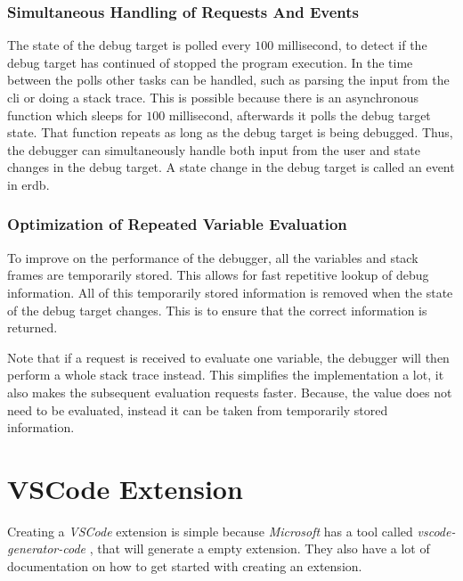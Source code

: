 \subsubsection{Simultaneous Handling of Requests And Events}
The state of the debug target is polled every $100$ millisecond, to detect if the debug target has continued of stopped the program execution.
In the time between the polls other tasks can be handled, such as parsing the input from the \acrshort{cli} or doing a stack trace.
This is possible because there is an asynchronous function which sleeps for $100$ millisecond, afterwards it polls the debug target state.
That function repeats as long as the debug target is being debugged.
Thus, the debugger can simultaneously handle both input from the user and state changes in the debug target.
A state change in the debug target is called an event in \gls{erdb}.



\subsubsection{Optimization of Repeated Variable Evaluation}
To improve on the performance of the debugger, all the variables and stack frames are temporarily stored.
This allows for fast repetitive lookup of debug information.
All of this temporarily stored information is removed when the state of the debug target changes.
This is to ensure that the correct information is returned.


Note that if a request is received to evaluate one variable, the debugger will then perform a whole stack trace instead.
This simplifies the implementation a lot, it also makes the subsequent evaluation requests faster.
Because, the value does not need to be evaluated, instead it can be taken from temporarily stored information.



\section{VSCode Extension}
Creating a \emph{VSCode} extension is simple because \emph{Microsoft} has a tool called \emph{vscode-generator-code} \cite{vscode-generator-code}, that will generate a empty extension.
They also have a lot of documentation on how to get started with creating an extension.


